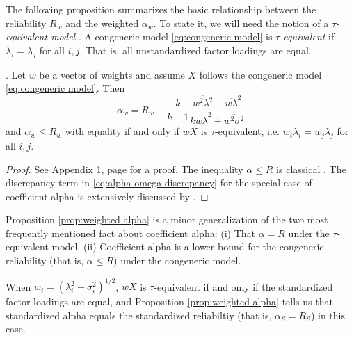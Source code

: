 \documentclass[twoside]{article}
\renewcommand{\sqrt}[1]{{(#1)^{1/2}}}
\begin{document}
The following proposition summarizes the basic relationship
between the reliability $ R_{w}$ and the weighted $\alpha_{w}$. To state it, we will need
the notion of a \textit{$\tau$-equivalent model} \citep[][section 2.13]{Lord1968-ax}. A congeneric model \eqref{eq:congeneric model} is \textit{$\tau$-equivalent} if $\lambda_{i}=\lambda_{j}$ for all $i,j$. That is, all unstandardized
factor loadings are equal.
\begin{prop}
\label{prop:weighted alpha}. Let $w$ be a vector of weights and
assume $X$ follows the congeneric model \eqref{eq:congeneric model}. Then 
\begin{equation}
\alpha_{w}= R_{w}-\frac{k}{k-1}\frac{\overline{w^{2}\lambda^{2}}-\overline{w\lambda}^{2}}{k\overline{w\lambda}^{2}+\overline{w^{2}\sigma^{2}}}\label{eq:alpha-omega discrepancy}
\end{equation}
and $\alpha_w \leq  R_w$ with equality if and only if $wX$ is $\tau$-equivalent, i.e. $w_i\lambda_{i}=w_j\lambda_{j}$
for all $i,j$.
\end{prop}
\begin{proof}
See Appendix 1, page \pageref{proof:weighted alpha}
for a proof. The inequality $\alpha\leq R$ is classical \citep[][Theorem 4.4.3]{Lord1968-ax}. The discrepancy term in \eqref{eq:alpha-omega discrepancy} for the special case of coefficient alpha is extensively discussed by \citet{Raykov1997-bu}. 
\end{proof}


Proposition \ref{prop:weighted alpha} is a minor generalization of the two most frequently mentioned fact about coefficient alpha: (i) That $\alpha =  R$ under the $\tau$-equivalent model. (ii) Coefficient alpha is a lower bound for the congeneric reliability (that is, $\alpha \leq  R$) under the congeneric model.
 
When $w_{i}=\sqrt{\lambda_{i}^{2}+\sigma_{i}^{2}}$, $wX$ is $\tau$-equivalent if and only if the standardized factor loadings are equal, and Proposition \ref{prop:weighted alpha} tells us that standardized alpha equals the standardized reliabiltiy (that is, $\alpha_S =  R_S$) in this case. 
\end{document}
